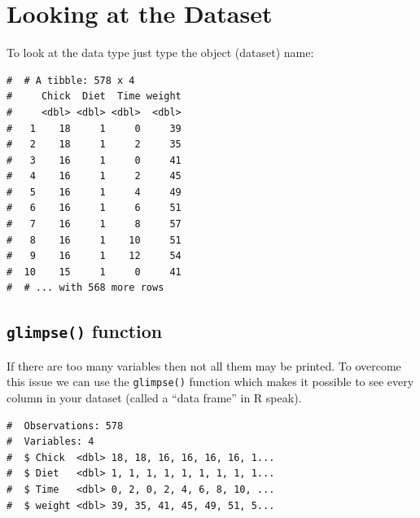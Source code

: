 \documentclass[a4paper,9pt,twocolumn,twoside,printwatermark=false]{pinp}
\begin{document}
\section{Looking at the Dataset}\label{looking-at-the-dataset}

To look at the data type just type the object (dataset) name:

\begin{Shaded}
\begin{Highlighting}[]
\end{Highlighting}
\end{Shaded}

\begin{ShadedResult}
\begin{verbatim}
#  # A tibble: 578 x 4
#     Chick  Diet  Time weight
#     <dbl> <dbl> <dbl>  <dbl>
#   1    18     1     0     39
#   2    18     1     2     35
#   3    16     1     0     41
#   4    16     1     2     45
#   5    16     1     4     49
#   6    16     1     6     51
#   7    16     1     8     57
#   8    16     1    10     51
#   9    16     1    12     54
#  10    15     1     0     41
#  # ... with 568 more rows
\end{verbatim}
\end{ShadedResult}

\subsection{\texorpdfstring{\texttt{glimpse()}
function}{glimpse() function}}\label{glimpse-function}

If there are too many variables then not all them may be printed. To
overcome this issue we can use the \texttt{glimpse()} function which
makes it possible to see every column in your dataset (called a ``data
frame'' in R speak).

\begin{Shaded}
\begin{Highlighting}[]
\end{Highlighting}
\end{Shaded}

\begin{ShadedResult}
\begin{verbatim}
#  Observations: 578
#  Variables: 4
#  $ Chick  <dbl> 18, 18, 16, 16, 16, 16, 1...
#  $ Diet   <dbl> 1, 1, 1, 1, 1, 1, 1, 1, 1...
#  $ Time   <dbl> 0, 2, 0, 2, 4, 6, 8, 10, ...
#  $ weight <dbl> 39, 35, 41, 45, 49, 51, 5...
\end{verbatim}
\end{ShadedResult}
\end{document}
